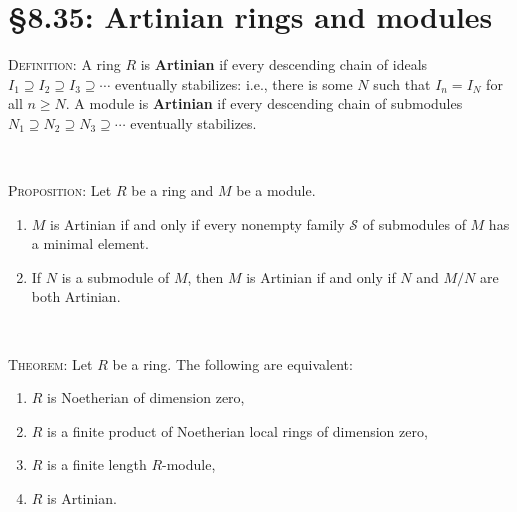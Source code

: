 \documentclass[12pt]{amsart}
\renewcommand{\1}{\mathbbm{1}}
\newcommand{\showsol}[1]{\def\displaysol{#1}}
\begin{document}
\showsol{0}
	
	\thispagestyle{empty}
	
	\section*{\S8.35: Artinian rings and modules}
	
	\begin{framed}
	
	\noindent	 \textsc{Definition:} A ring $R$ is \textbf{Artinian} if every descending chain of ideals $I_1 \supseteq I_2 \supseteq I_3 \supseteq \cdots$ eventually stabilizes: i.e., there is some $N$ such that $I_n=I_N$ for all $n\geq N$. A module is \textbf{Artinian} if every descending chain of submodules $N_1 \supseteq N_2 \supseteq N_3 \supseteq \cdots$ eventually stabilizes.
	
	\
	
	\noindent \textsc{Proposition:} Let $R$ be a ring and $M$ be a module.
	\begin{enumerate}
	\item $M$ is Artinian if and only if every nonempty family $\mathcal{S}$ of submodules of $M$ has a minimal element.
	\item If $N$ is a submodule of $M$, then $M$ is Artinian if and only if $N$ and $M/N$ are both Artinian.
	\end{enumerate}
	
\
	
		\noindent	\textsc{Theorem:} Let $R$ be a ring. The following are equivalent:
		\begin{enumerate}
		\item $R$ is Noetherian of dimension zero,
		\item $R$ is a finite product of Noetherian local rings of dimension zero,
		\item $R$ is a finite length $R$-module,
		\item $R$ is Artinian.
		\end{enumerate}
	
		\end{framed}
\end{document}
